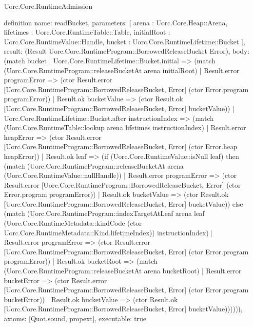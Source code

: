 \begin{lexlean}{Uorc.Core.RuntimeAdmission}
\begin{semanticmodule}
definition{
  name: readBucket,
  parameters: [
    arena : Uorc.Core.Heap::Arena,
    lifetimes : Uorc.Core.RuntimeTable::Table,
    initialRoot : Uorc.Core.RuntimeValue::Handle,
    bucket : Uorc.Core.RuntimeLifetime::Bucket
  ],
  result: (Result Uorc.Core.RuntimeProgram::BorrowedReleaseBucket Error),
  body: (match bucket
    | Uorc.Core.RuntimeLifetime::Bucket.initial => (match (Uorc.Core.RuntimeProgram::releaseBucketAt arena initialRoot)
      | Result.error programError => (ctor Result.error [Uorc.Core.RuntimeProgram::BorrowedReleaseBucket, Error] (ctor Error.program programError))
      | Result.ok bucketValue => (ctor Result.ok [Uorc.Core.RuntimeProgram::BorrowedReleaseBucket, Error] bucketValue))
    | Uorc.Core.RuntimeLifetime::Bucket.after instructionIndex => (match (Uorc.Core.RuntimeTable::lookup arena lifetimes instructionIndex)
      | Result.error heapError => (ctor Result.error [Uorc.Core.RuntimeProgram::BorrowedReleaseBucket, Error] (ctor Error.heap heapError))
      | Result.ok leaf => (if (Uorc.Core.RuntimeValue::isNull leaf) then (match (Uorc.Core.RuntimeProgram::releaseBucketAt arena (Uorc.Core.RuntimeValue::nullHandle))
        | Result.error programError => (ctor Result.error [Uorc.Core.RuntimeProgram::BorrowedReleaseBucket, Error] (ctor Error.program programError))
        | Result.ok bucketValue => (ctor Result.ok [Uorc.Core.RuntimeProgram::BorrowedReleaseBucket, Error] bucketValue)) else (match (Uorc.Core.RuntimeProgram::indexTargetAtLeaf arena leaf (Uorc.Core.RuntimeMetadata::kindCode (ctor Uorc.Core.RuntimeMetadata::Kind.lifetimeIndex)) instructionIndex)
        | Result.error programError => (ctor Result.error [Uorc.Core.RuntimeProgram::BorrowedReleaseBucket, Error] (ctor Error.program programError))
        | Result.ok bucketRoot => (match (Uorc.Core.RuntimeProgram::releaseBucketAt arena bucketRoot)
          | Result.error bucketError => (ctor Result.error [Uorc.Core.RuntimeProgram::BorrowedReleaseBucket, Error] (ctor Error.program bucketError))
          | Result.ok bucketValue => (ctor Result.ok [Uorc.Core.RuntimeProgram::BorrowedReleaseBucket, Error] bucketValue)))))),
  axioms: [Quot.sound, propext],
  executable: true
}


\end{semanticmodule}
\end{lexlean}
